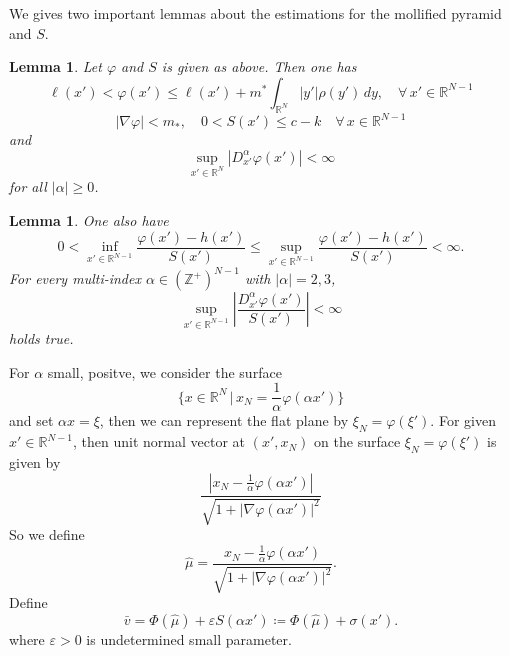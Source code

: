 \documentclass[12pt, a4paper]{article}
\newtheorem{lemma}[thm]{Lemma}
\numberwithin{equation}{section}
\newcommand{\R}{\mathbb{R}}
\newcommand{\Z}{\mathbb{Z}}
\newcommand{\hmu}{\hat{\mu}}
\begin{document}
\begin{CJK}{UTF8}{bkai}
We gives two important lemmas about the estimations for the mollified pyramid and $S$.

\begin{lemma}\cite[Lemma 2.2]{KT2011}\label{lem2.5}
	Let $\varphi$ and $S$ is given as above. Then one has
\[
	\ell(x')<\varphi(x')\leq \ell(x')+m^*\int_{\R^N}|y'|\rho(y')\,dy,\quad\forall\,x'\in\R^{N-1}
\]
\[
	|\nabla\varphi|<m_*,\quad 0<S(x')\leq c-k\quad\forall\,x\in\R^{N-1}
\]
and
\[
	\sup_{x'\in\R^N}\left|D^{\alpha}_{x'}\varphi(x')\right|<\infty
\]
for all $|\alpha|\geq 0$.
\end{lemma}

\begin{lemma}\cite[Proposition 2.3]{KT2011}\label{lem2.6}
	One also have
\[
	0<\inf_{x'\in\R^{N-1}}\frac{\varphi(x')-h(x')}{S(x')}\leq\sup_{x'\in\R^{N-1}}\frac{\varphi(x')-h(x')}{S(x')}<\infty.
\]
For every multi-index $\alpha\in(\Z^+)^{N-1}$ with $|\alpha|=2,3$,
\[
	\sup_{x'\in\R^{N-1}}\left|\frac{D^\alpha_{x'}\varphi(x')}{S(x')}\right|<\infty
\]
holds true.
\end{lemma}

For $\alpha$ small, positve, we consider the surface
\begin{equation}
	\{x\in\R^N\,|\,x_N=\frac{1}{\alpha}\varphi(\alpha x')\}
\end{equation}
and set $\alpha x=\xi$, then we can represent the flat plane by $\xi_N=\varphi(\xi')$. For given $x'\in\R^{N-1}$, then unit normal vector at $(x',x_N)$ on the surface $\xi_N=\varphi(\xi')$ is given by
\[
	\frac{|x_N-\frac{1}{\alpha}\varphi(\alpha x')|}{\sqrt{1+|\nabla\varphi(\alpha x')|^2}}
\]
So we define
\begin{equation}\label{iden2.17}
	\hmu=\frac{x_N-\frac{1}{\alpha}\varphi(\alpha x')}{\sqrt{1+|\nabla\varphi(\alpha x')|^2}}.
\end{equation}
Define 
\begin{equation}\label{iden2.18}
	\bar{v}=\Phi(\hat{\mu})+\varepsilon S(\alpha x')\coloneqq \Phi(\hmu)+\sigma(x').
\end{equation}
where $\varepsilon>0$ is undetermined small parameter. 




\end{CJK}
\end{document}
